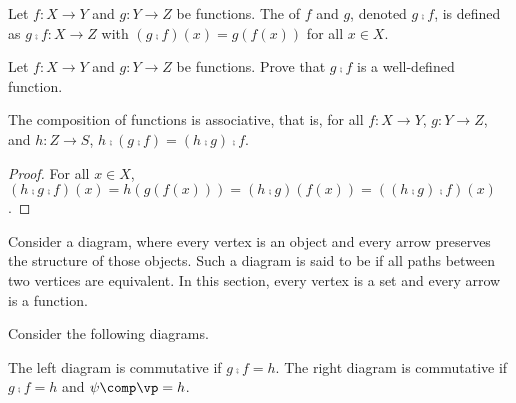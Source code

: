 \documentclass[10pt]{article}
\begin{document}
\begin{definition}
    Let $f:X\to Y$ and $g:Y\to Z$ be functions. The  of $f$ and $g$, denoted $g\comp f$, is defined as $g\comp f:X\to Z$ with $(g\comp f)(x)=g(f(x))$ for all $x\in X$.
\end{definition}
\begin{problem}
    Let $f:X\to Y$ and $g:Y\to Z$ be functions. Prove that $g\comp f$ is a well-defined function.
\end{problem}
\begin{proposition}
    The composition of functions is associative, that is, for all $f:X\to Y$, $g:Y\to Z$, and $h:Z\to S$, $h\comp(g\comp f)=(h\comp g)\comp f$.
\end{proposition}
\begin{proof}
    For all $x\in X$, $(h\comp g\comp f)(x)=h(g(f(x)))=(h\comp g)(f(x))=((h\comp g)\comp f)(x)$.
\end{proof}
\par
Consider a diagram, where every vertex is an object and every arrow preserves the structure of those objects. Such a diagram is said to be  if all paths between two vertices are equivalent. In this section, every vertex is a set and every arrow is a function.
\begin{example}
    Consider the following diagrams.
    \begin{center}
        \hspace{3cm}
    \end{center}
    The left diagram is commutative if $g\comp f=h$. The right diagram is commutative if $g\comp f=h$ and $\psi\comp\vp=h$.
\end{example}
\end{document}
